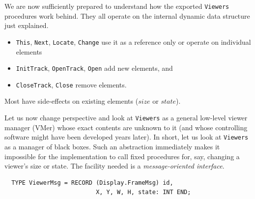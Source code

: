 We are now sufficiently prepared to understand how the exported \verb|Viewers| procedures
work behind.  They all operate on the internal dynamic data structure just explained.
\begin{itemize}
  \item \verb|This|, \verb|Next|, \verb|Locate|, \verb|Change| use it as a reference only
    or operate on individual elements
  \item \verb|InitTrack|, \verb|OpenTrack|, \verb|Open| add new elements, and
  \item \verb|CloseTrack|, \verb|Close| remove elements.
\end{itemize}
Most have side-effects on existing elements ($size$ or $state$).

Let us now change perspective and look at \verb|Viewers| as
a general low-level viewer manager (VMer) whose exact contents are unknown to it
(and whose controlling software might have been developed years later).
In short, let us look at \verb|Viewers| as a manager of black boxes.
Such an abstraction immediately makes it impossible for the implementation to call fixed procedures
for, say, changing a viewer's size or state.
The facility needed is a \emph{message-oriented interface}.
\begin{verbatim}
  TYPE ViewerMsg = RECORD (Display.FrameMsg) id,
                          X, Y, W, H, state: INT END;
\end{verbatim}

